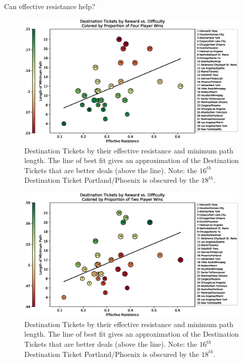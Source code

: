 Can effective resistance help?
\begin{figure}[!ht]
\centering
\includegraphics[scale=.8]{figures/resistance_four}
\caption{Destination Tickets by their effective
resistance and minimum path length.
The line of best fit gives an approximation of the
Destination Tickets that are better deals (above the line).
Note: the $16^{th}$ Destination Ticket Portland/Phoenix is obscured
by the $18^{th}$.}
\label{fig:resistance}
\end{figure}

\begin{figure}[!ht]
\centering
\includegraphics[scale=.8]{figures/resistance_two}
\caption{Destination Tickets by their effective
resistance and minimum path length.
The line of best fit gives an approximation of the
Destination Tickets that are better deals (above the line).
Note: the $16^{th}$ Destination Ticket Portland/Phoenix is obscured
by the $18^{th}$.}
\label{fig:resistance}
\end{figure}
